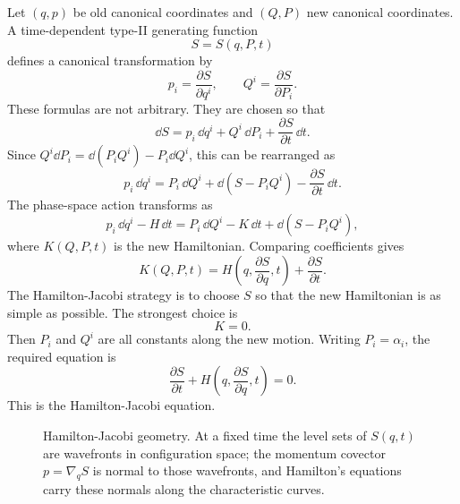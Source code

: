 Let \((q,p)\) be old canonical coordinates and \((Q,P)\) new canonical
coordinates. A time-dependent type-II generating function
\[
  S=S(q,P,t)
\]
defines a canonical transformation by
\[
  p_i=\frac{\partial S}{\partial q^i},
  \qquad
  Q^i=\frac{\partial S}{\partial P_i}.
\]
These formulas are not arbitrary. They are chosen so that
\[
  \dd S=p_i\,\dd q^i+Q^i\,\dd P_i+\frac{\partial S}{\partial t}\,\dd t.
\]
Since \(Q^i\dd P_i=\dd(P_iQ^i)-P_i\dd Q^i\), this can be rearranged as
\[
  p_i\,\dd q^i
  =
  P_i\,\dd Q^i
  +
  \dd(S-P_iQ^i)
  -
  \frac{\partial S}{\partial t}\,\dd t.
\]
The phase-space action transforms as
\[
  p_i\,\dd q^i-H\,\dd t
  =
  P_i\,\dd Q^i-K\,\dd t+\dd(S-P_iQ^i),
\]
where \(K(Q,P,t)\) is the new Hamiltonian. Comparing coefficients gives
\[
  K(Q,P,t)
  =
  H\!\left(q,\frac{\partial S}{\partial q},t\right)
  +
  \frac{\partial S}{\partial t}.
\]
The Hamilton-Jacobi strategy is to choose \(S\) so that the new Hamiltonian is
as simple as possible. The strongest choice is
\[
  K=0.
\]
Then \(P_i\) and \(Q^i\) are all constants along the new motion. Writing
\(P_i=\alpha_i\), the required equation is
\[
  \boxed{
  \frac{\partial S}{\partial t}
  +
  H\!\left(q,\frac{\partial S}{\partial q},t\right)=0.
  }
\]
This is the Hamilton-Jacobi equation.

\begin{figure}[htbp]
\centering
{}
\caption{Hamilton-Jacobi geometry. At a fixed time the level sets of
\(S(q,t)\) are wavefronts in configuration space; the momentum covector
\(p=\nabla_qS\) is normal to those wavefronts, and Hamilton's equations carry
these normals along the characteristic curves.}
\label{fig:hj-wavefront-characteristics}
\end{figure}

